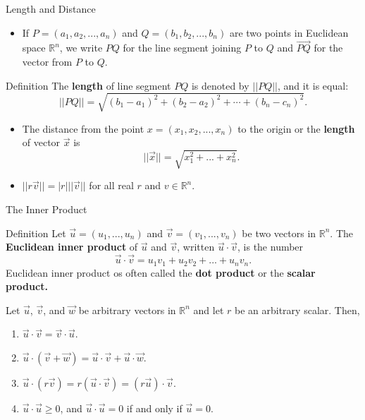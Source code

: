 \documentclass{beamer}
\begin{document}
\begin{frame}{Length and Distance}
\begin{itemize}
    \item If $P=(a_1,a_2,...,a_n)$ and $Q=(b_1, b_2,..., b_n)$ are two points in Euclidean space $\mathbb{R}^n$, we write $PQ$ for the line segment joining $P$ to $Q$ and $\vec{PQ}$ for the vector from $P$ to $Q$. 
    
\end{itemize}
\begin{block}{Definition}
    The \textbf{length} of line segment $PQ$ is denoted by $\lvert\lvert PQ\rvert \rvert $, and it is equal:
    \[\lvert\lvert PQ\rvert \rvert =\sqrt{(b_1-a_1)^2+(b_2-a_2)^2+\cdots+(b_n-c_n)^2}.
    \]
\end{block}
    \begin{itemize}
        \item The distance from the point $x=(x_1, x_2,...,x_n)$ to the origin or the \textbf{length } of vector $\vec{x}$ is 
        \[\lvert\lvert \vec{x}\rvert \rvert= \sqrt{x_1^2+...+x_n^2}.
        \]
        \item $\lvert\lvert r \vec{v}\rvert \rvert= |r|\lvert\lvert \vec{v}\rvert \rvert$ for all real $r$ and $v\in \mathbb{R}^n$.
    \end{itemize}
    \end{frame}


\begin{frame}{The Inner Product}
\begin{block}{Definition}
Let $\vec{u}=(u_1,..., u_n)$ and $\vec{v}=(v_1,..., v_n)$ be two vectors in $\mathbb{R}^n$. The \textbf{Euclidean inner product} of $\vec{u}$ and $\vec{v}$, written $\vec{u}\cdot\vec{v}$, is the number
\[\vec{u}\cdot\vec{v}=u_1v_1+u_2v_2+...+u_nv_n.
\]
Euclidean inner product os often called the \textbf{dot product} or the \textbf{scalar product.}
\end{block}
Let $\vec{u}$, $\vec{v}$, and $\vec{w}$ be arbitrary vectors in $\mathbb{R}^n$ and let $r$ be an arbitrary scalar. Then,
\begin{enumerate}
    \item $\vec{u}\cdot\vec{v}=\vec{v}\cdot\vec{u}$.
    \item $\vec{u}\cdot(\vec{v}+\vec{w})=\vec{u}\cdot\vec{v}+\vec{u}\cdot\vec{w}$.
    \item $\vec{u}\cdot(r\vec{v})=r(\vec{u}\cdot\vec{v})=(r\vec{u})\cdot\vec{v}$.
    \item $\vec{u}\cdot\vec{u}\geq 0$, and $\vec{u}\cdot\vec{u}=0$ if and only if $\vec{u}=0$.
\end{enumerate}
 \end{frame}
\end{document}
